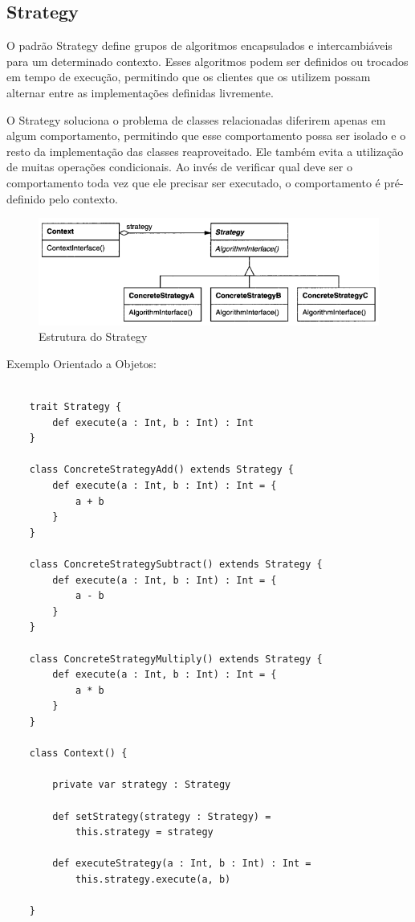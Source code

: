 \subsection{Strategy}

O padrão Strategy define grupos de algoritmos encapsulados e
 intercambiáveis para um determinado contexto. Esses 
 algoritmos podem ser definidos ou trocados em tempo de 
 execução, permitindo que os clientes que os utilizem possam
  alternar entre as implementações definidas livremente.

O Strategy soluciona o problema de classes relacionadas 
diferirem apenas em algum comportamento, permitindo que 
esse comportamento possa ser isolado e o resto da implementação 
das classes reaproveitado. Ele também evita a utilização de 
muitas operações condicionais. Ao invés de verificar qual 
deve ser o comportamento toda vez que ele precisar ser 
executado, o comportamento é pré-definido pelo contexto.

\begin{figure}[htb]
	\caption{\label{fig_grafico}Estrutura do Strategy}
	\begin{center}
	    \includegraphics[scale=0.5]{5_padroes-contexto-funcional/5.3_comportamentais/5.3.09_strategy/diagram.png}
	\end{center}
\end{figure}

Exemplo Orientado a Objetos:

\begin{lstlisting}[caption={Strategy Orientação a Objetos},label=oostrategy]
    
    trait Strategy {
        def execute(a : Int, b : Int) : Int
    }

    class ConcreteStrategyAdd() extends Strategy {
        def execute(a : Int, b : Int) : Int = {
            a + b
        }
    }

    class ConcreteStrategySubtract() extends Strategy {
        def execute(a : Int, b : Int) : Int = {
            a - b
        }
    }

    class ConcreteStrategyMultiply() extends Strategy {
        def execute(a : Int, b : Int) : Int = {
            a * b
        }
    }

    class Context() {
        
        private var strategy : Strategy

        def setStrategy(strategy : Strategy) =
            this.strategy = strategy

        def executeStrategy(a : Int, b : Int) : Int =
            this.strategy.execute(a, b)

    }

\end{lstlisting}

